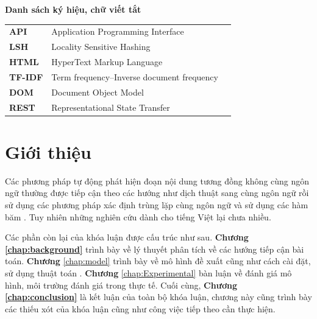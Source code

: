 \documentclass[12pt]{report}
\begin{document}
\newpage
\tableofcontents

\newpage
{}
\listoftables

\newpage
{}
\begin{flushleft}
\bfseries{\Huge{Danh sách ký hiệu, chữ viết tắt}}
\end{flushleft}
\begin{table}[h]
	\centering
	\begin{tabular}{lll}
		\textbf{API }  & Application Programming Interface\\[0.3cm]
		\textbf{LSH}  & Locality Sensitive Hashing \\[0.3cm]
		\textbf{HTML} &  HyperText Markup Language \\[0.3cm]
		\textbf{TF-IDF} & Term frequency–Inverse document frequency \\[0.3cm]
		\textbf{DOM} & Document Object Model \\[0.3cm]
		\textbf{REST} & Representational State Transfer \\[0.3cm]

	\end{tabular}
\end{table}

\newpage
{}
\listoffigures

\newpage
{}
\setcounter{page}{1}
\chapter{Giới thiệu}
\label{chap:intro}

Các phương pháp tự động phát hiện đoạn nội dung tương đồng không cùng ngôn ngữ thường được tiếp cận theo các hướng như dịch thuật sang cùng ngôn ngữ rồi sử dụng các phương pháp xác định trùng lặp cùng ngôn ngữ và sử dụng các hàm băm \cite{cia-old}. Tuy nhiên những nghiên cứu dành cho tiếng Việt lại chưa nhiều.

Các phần còn lại của khóa luận được cấu trúc như sau. \textbf{Chương \ref{chap:background}} trình bày về lý thuyết phân tích về các hướng tiếp cận bài toán. \textbf{Chương} \ref{chap:model} trình bày về mô hình đề xuất cũng như cách cài đặt, sử dụng thuật toán . \textbf{Chương} \ref{chap:Experimental} bàn luận về đánh giá mô hình, môi trường đánh giá trong thực tế. Cuối cùng, \textbf{Chương \ref{chap:conclusion}} là kết luận của toàn bộ khóa luận, chương này cũng trình bày các thiếu xót của khóa luận cũng như công việc tiếp theo cần thực hiện.
\newpage
\end{document}
